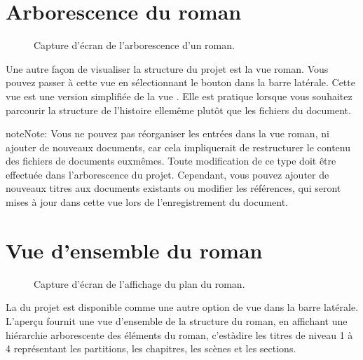 \documentclass[a4paper,11pt,french]{sphinxmanual}
\begin{document}
\section{Arborescence du roman}
\label{\detokenize{usage_project:the-novel-tree-view}}\label{\detokenize{usage_project:a-ui-tree-novel}}
\begin{figure}[htbp]
\centering
\capstart

\noindent{}
\caption{Capture d’écran de l’arborescence d’un roman.}\label{\detokenize{usage_project:id4}}\end{figure}

\sphinxAtStartPar
Une autre façon de visualiser la structure du projet est la vue roman. Vous pouvez passer à cette vue en sélectionnant le bouton  dans la barre latérale. Cette vue est une version simplifiée de la vue . Elle est pratique lorsque vous souhaitez parcourir la structure de l’histoire elle\sphinxhyphen{}même plutôt que les fichiers du document.

\begin{sphinxadmonition}{note}{Note:}
\sphinxAtStartPar
Vous ne pouvez pas réorganiser les entrées dans la vue roman, ni ajouter de nouveaux documents, car cela impliquerait de restructurer le contenu des fichiers de documents eux\sphinxhyphen{}mêmes. Toute modification de ce type doit être effectuée dans l’arborescence du projet. Cependant, vous pouvez ajouter de nouveaux titres aux documents existants ou modifier les références, qui seront mises à jour dans cette vue lors de l’enregistrement du document.
\end{sphinxadmonition}


\section{Vue d’ensemble du roman}
\label{\detokenize{usage_project:the-novel-outline-view}}\label{\detokenize{usage_project:a-ui-outline}}
\begin{figure}[htbp]
\centering
\capstart

\noindent{}
\caption{Capture d’écran de l’affichage du plan du roman.}\label{\detokenize{usage_project:id5}}\end{figure}

\sphinxAtStartPar
La  du projet est disponible comme une autre option de vue dans la barre latérale. L’aperçu fournit une vue d’ensemble de la structure du roman, en affichant une hiérarchie arborescente des éléments du roman, c’est\sphinxhyphen{}à\sphinxhyphen{}dire les titres de niveau 1 à 4 représentant les partitions, les chapitres, les scènes et les sections.
\end{document}
